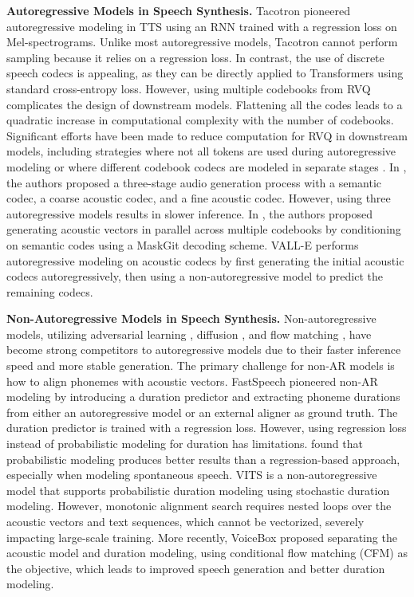 {\bf Autoregressive Models in Speech Synthesis.} Tacotron \citep{tacotron,wang2017tacotron} pioneered autoregressive modeling in TTS using an RNN trained with a regression loss on Mel-spectrograms. Unlike most autoregressive models, Tacotron cannot perform sampling because it relies on a regression loss. In contrast, the use of discrete speech codecs is appealing, as they can be directly applied to Transformers using standard cross-entropy loss. However, using multiple codebooks from RVQ complicates the design of downstream models. Flattening all the codes leads to a quadratic increase in computational complexity with the number of codebooks. Significant efforts have been made to reduce computation for RVQ in downstream models, including strategies where not all tokens are used during autoregressive modeling or where different codebook codecs are modeled in separate stages \citep{copet2024simple,valle}.
In \citep{borsos2023audiolm}, the authors proposed a three-stage audio generation process with a semantic codec, a coarse acoustic codec, and a fine acoustic codec. However, using three autoregressive models results in slower inference. In \citep{borsos2023soundstorm}, the authors proposed generating acoustic vectors in parallel across multiple codebooks by conditioning on semantic codes using a MaskGit decoding scheme. VALL-E \citep{valle} performs autoregressive modeling on acoustic codecs by first generating the initial acoustic codecs autoregressively, then using a non-autoregressive model to predict the remaining codecs.

{\bf Non-Autoregressive Models in Speech Synthesis.}
Non-autoregressive models, utilizing adversarial learning \citep{hifigan,vits,lim2022jets}, diffusion \citep{jeong2021diff,popov2021grad,huang2022prodiff,liu2022diffgan,li2024styletts}, and flow matching \citep{voicebox,mehta2024matcha}, have become strong competitors to autoregressive models due to their faster inference speed and more stable generation.
The primary challenge for non-AR models is how to align phonemes with acoustic vectors. FastSpeech \citep{fastspeech,fastspeech2} pioneered non-AR modeling by introducing a duration predictor and extracting phoneme durations from either an autoregressive model or an external aligner as ground truth. The duration predictor is trained with a regression loss. However, using regression loss instead of probabilistic modeling for duration has limitations. \citep{mehta2024should} found that probabilistic modeling produces better results than a regression-based approach, especially when modeling spontaneous speech.
VITS \citep{vits} is a non-autoregressive model that supports probabilistic duration modeling using stochastic duration modeling. However, monotonic alignment search requires nested loops over the acoustic vectors and text sequences, which cannot be vectorized, severely impacting large-scale training.
More recently, VoiceBox \citep{voicebox} proposed separating the acoustic model and duration modeling, using conditional flow matching (CFM) as the objective, which leads to improved speech generation and better duration modeling.

